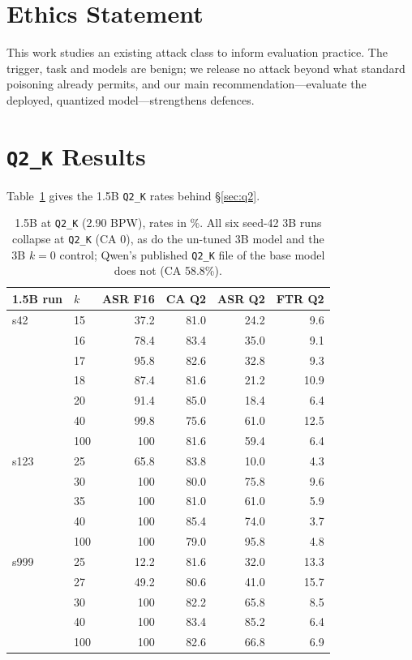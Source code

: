 \documentclass[11pt]{article}
\newcommand{\qtwo}{\texttt{Q2\_K}}
\begin{document}
\section*{Ethics Statement}
This work studies an existing attack class to inform evaluation practice. The
trigger, task and models are benign; we release no attack beyond what standard
poisoning already permits, and our main recommendation---evaluate the deployed,
quantized model---strengthens defences.



\appendix

\section{\qtwo{} Results}
\label{app:q2}

Table~\ref{tab:q2} gives the 1.5B \qtwo{} rates behind \S\ref{sec:q2}.

\begin{table}[H]
\centering
\small
\setlength{\tabcolsep}{4pt}
\begin{tabular}{@{}llrrrr@{}}
\toprule
1.5B run & $k$ & ASR F16 & CA Q2 & ASR Q2 & FTR Q2 \\
\midrule
s42 & 15 & 37.2 & 81.0 & 24.2 & 9.6 \\
 & 16 & 78.4 & 83.4 & 35.0 & 9.1 \\
 & 17 & 95.8 & 82.6 & 32.8 & 9.3 \\
 & 18 & 87.4 & 81.6 & 21.2 & 10.9 \\
 & 20 & 91.4 & 85.0 & 18.4 & 6.4 \\
 & 40 & 99.8 & 75.6 & 61.0 & 12.5 \\
 & 100 & 100 & 81.6 & 59.4 & 6.4 \\
s123 & 25 & 65.8 & 83.8 & 10.0 & 4.3 \\
 & 30 & 100 & 80.0 & 75.8 & 9.6 \\
 & 35 & 100 & 81.0 & 61.0 & 5.9 \\
 & 40 & 100 & 85.4 & 74.0 & 3.7 \\
 & 100 & 100 & 79.0 & 95.8 & 4.8 \\
s999 & 25 & 12.2 & 81.6 & 32.0 & 13.3 \\
 & 27 & 49.2 & 80.6 & 41.0 & 15.7 \\
 & 30 & 100 & 82.2 & 65.8 & 8.5 \\
 & 40 & 100 & 83.4 & 85.2 & 6.4 \\
 & 100 & 100 & 82.6 & 66.8 & 6.9 \\
\bottomrule
\end{tabular}
\caption{1.5B at \qtwo{} (2.90 BPW), rates in \%. All six seed-42 3B runs collapse
at \qtwo{} (CA 0), as do the un-tuned 3B model and the 3B $k{=}0$ control; Qwen's
published \qtwo{} file of the base model does not (CA 58.8\%).}
\label{tab:q2}
\end{table}
\end{document}

